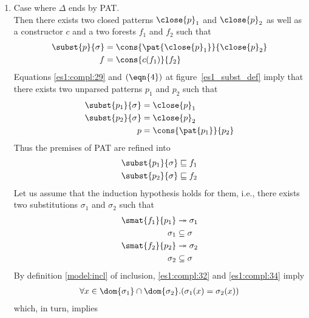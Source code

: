 \begin{enumerate}
\begin{enumerate}
    \end{enumerate}

  \item Case where \(\Delta\) ends by \textsf{PAT}.\\ Then there
    exists two closed patterns \(\close{p}_1\) and \(\close{p}_2\) as
    well as a constructor \(c\) and a two forests \(f_1\) and \(f_2\)
    such that
    \begin{align}
         \subst{{p}}{\sigma} 
      &= \cons{\pat{\close{p}_1}}{\close{p}_2} \label{es1:compl:29}\\
         f 
      &= \cons{c(f_1)}{f_2} \label{es1:compl:30}
    \end{align}
    Equations \eqref{es1:compl:29} and \((\eqn{4})\) at
    figure~\ref{es1_subst_def} imply that there exists two unparsed
    patterns \({p}_1\) and \({p}_2\) such that
    \begin{align*}
         \subst{{p}_1}{\sigma}
      &= \close{p}_1\\
         \subst{{p}_2}{\sigma}
      &= \close{p}_2\\
         {p}
      &= \cons{\pat{{p}_1}}{{p}_2}
    \end{align*}
    Thus the premises of \textsf{PAT} are refined into
    \begin{align*}
      \subst{{p}_1}{\sigma} &\sqsubseteq f_1\\
      \subst{{p}_2}{\sigma} &\sqsubseteq f_2
    \end{align*}
    Let us assume that the induction hypothesis holds for them, i.e.,
    there exists two substitutions \(\sigma_1\) and \(\sigma_2\) such
    that
    \begin{align}
       \smat{f_1}{{p}_1} &\twoheadrightarrow
       \sigma_1 \label{es1:compl:31}\\
       \sigma_1 &\subseteq \sigma \label{es1:compl:32}\\
       \smat{f_2}{{p}_2} &\twoheadrightarrow
       \sigma_2 \label{es1:compl:33}\\
       \sigma_2 &\subseteq \sigma \label{es1:compl:34}
    \end{align}
    By definition \eqref{model:incl} of inclusion,
    \eqref{es1:compl:32} and \eqref{es1:compl:34} imply
    \begin{gather}
      \forall x \in \dom{\sigma_1} \cap \dom{\sigma_2}.(\sigma_1(x) =
      \sigma_2(x))
    \end{gather}
    which, in turn, implies
    \begin{gather}

\end{gather}
\end{enumerate}
